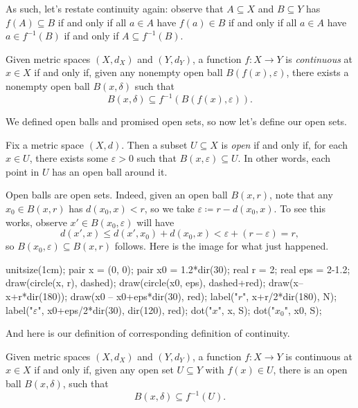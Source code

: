\documentclass[../notes.tex]{subfiles}
\begin{document}
As such, let's restate continuity again: observe that $A\subseteq X$ and $B\subseteq Y$ has $f(A)\subseteq B$ if and only if all $a\in A$ have $f(a)\in B$ if and only if all $a\in A$ have $a\in f^{-1}(B)$ if and only if $A\subseteq f^{-1}(B)$.
\begin{defihelper}[Continuous]
	Given metric spaces $(X,d_X)$ and $(Y,d_Y)$, a function $f\colon X\to Y$ is \textit{continuous} at $x\in X$ if and only if, given any nonempty open ball $B(f(x),\varepsilon)$, there exists a nonempty open ball $B(x,\delta)$ such that
	\[B(x,\delta)\subseteq f^{-1}(B(f(x),\varepsilon)).\]
\end{defihelper}
We defined open balls and promised open sets, so now let's define our open sets.
\begin{definition}
	Fix a metric space $(X,d)$. Then a subset $U\subseteq X$ is \textit{open} if and only if, for each $x\in U$, there exists some $\varepsilon>0$ such that $B(x,\varepsilon)\subseteq U$. In other words, each point in $U$ has an open ball around it.
\end{definition}
\begin{example} \label{ex:openballisopen}
	Open balls are open sets. Indeed, given an open ball $B(x,r)$, note that any $x_0\in B(x,r)$ has $d(x_0,x)<r$, so we take $\varepsilon\coloneqq r-d(x_0,x)$. To see this works, observe $x'\in B(x_0,\varepsilon)$ will have
	\[d(x',x)\le d(x',x_0)+d(x_0,x)<\varepsilon+(r-\varepsilon)=r,\]
	so $B(x_0,\varepsilon)\subseteq B(x,r)$ follows. Here is the image for what just happened.
	\begin{center}
		\begin{asy}
			unitsize(1cm);
			pair x = (0, 0);
			pair x0 = 1.2*dir(30);
			real r = 2;
			real eps = 2-1.2;
			draw(circle(x, r), dashed);
			draw(circle(x0, eps), dashed+red);
			draw(x--x+r*dir(180));
			draw(x0 -- x0+eps*dir(30), red);
			label("$r$", x+r/2*dir(180), N);
			label("$\varepsilon$", x0+eps/2*dir(30), dir(120), red);
			dot("$x$", x, S);
			dot("$x_0$", x0, S);
		\end{asy}
	\end{center}
\end{example}
And here is our definition of corresponding definition of continuity.
\begin{lemma} \label{lem:goodcont1}
	Given metric spaces $(X,d_X)$ and $(Y,d_Y)$, a function $f\colon X\to Y$ is continuous at $x\in X$ if and only if, given any open set $U\subseteq Y$ with $f(x)\in U$, there is an open ball $B(x,\delta)$, such that
	\[B(x,\delta)\subseteq f^{-1}(U).\]
\end{lemma}
\end{document}
